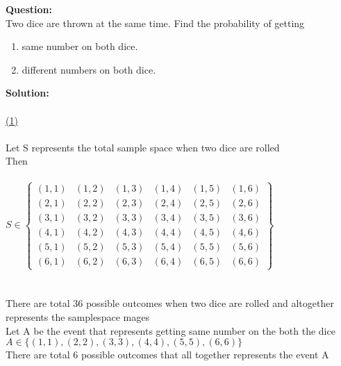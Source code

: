 \documentclass[journal,12pt,twocolumn]{IEEEtran}
\begin{document}
\maketitle
\newpage

\bigskip
\renewcommand{\thefigure}{\theenumi}
\renewcommand{\thetable}{\theenumi}

\textbf{Question:}\\
Two dice are thrown at the same time. Find the probability of getting
\begin{enumerate}
     \item same number on both dice.
     \item different numbers on both dice.
\end{enumerate}
 \textbf{Solution:}\\ \\ 
 \underline {(1)} \\ \\
 Let S represents the total sample space when two dice are rolled
 \\Then \\ \\
 $ S \in    \begin{Bmatrix}
             (1,1)& (1,2)& (1,3)& (1,4)& (1,5)& (1,6)\\
             (2,1)& (2,2)& (2,3)& (2,4)& (2,5)& (2,6)\\
             (3,1)& (3,2)& (3,3)& (3,4)& (3,5)& (3,6)\\
             (4,1)& (4,2)& (4,3)& (4,4)& (4,5)& (4,6)\\
             (5,1)& (5,2)& (5,3)& (5,4)& (5,5)& (5,6)\\
             (6,1)& (6,2)& (6,3)& (6,4)& (6,5)& (6,6)
    \end{Bmatrix}$ \\ \\ \\





\noindent There are total 36 possible outcomes when two dice are rolled and altogether represents the samplespace
mages\\

\noindent Let A be the event that represents getting  same number on the both the dice \\
     $A \in \{(1,1),(2,2),(3,3),(4,4),(5,5),(6,6)\}$ \\

     \noindent There are total 6 possible outcomes that all together represents the event A\\
     
\end{document}
